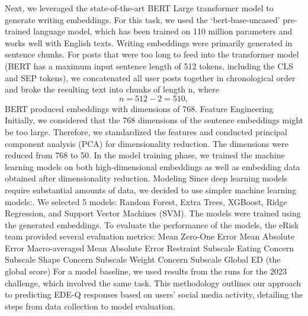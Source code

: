 \documentclass[]{style/ceurart}
\begin{document}
Next, we leveraged the state-of-the-art BERT Large transformer model to generate writing embeddings. For this task, we used the ‘bert-base-uncased’ pre-trained language model, which has been trained on 110 million parameters and works well with English texts. Writing embeddings were primarily generated in sentence chunks. For posts that were too long to feed into the transformer model (BERT has a maximum input sentence length of 512 tokens, including the CLS and SEP tokens), we concatenated all user posts together in chronological order and broke the resulting text into chunks of length n, where 
\begin{displaymath}
  n = 512 - 2 = 510 ,
\end{displaymath}
BERT produced embeddings with dimensions of 768.
Feature Engineering
Initially, we considered that the 768 dimensions of the sentence embeddings might be too large. Therefore, we standardized the features and conducted principal component analysis (PCA) for dimensionality reduction. The dimensions were reduced from 768 to 50. In the model training phase, we trained the machine learning models on both high-dimensional embeddings as well as embedding data obtained after dimensionality reduction.
Modeling
Since deep learning models require substantial amounts of data, we decided to use simpler machine learning models:. We selected 5 models: Random Forest, Extra Trees, XGBoost, Ridge Regression, and Support Vector Machines (SVM). The models were trained using the generated embeddings.
To evaluate the performance of the models, the eRisk team provided several evaluation metrics:
Mean Zero-One Error
Mean Absolute Error
Macro-averaged Mean Absolute Error
Restraint Subscale
Eating Concern Subscale
Shape Concern Subscale
Weight Concern Subscale
Global ED (the global score)
For a model baseline, we used results from the runs for the 2023 challenge, which involved the same task.
This methodology outlines our approach to predicting EDE-Q responses based on users' social media activity, detailing the steps from data collection to model evaluation.
\end{document}
